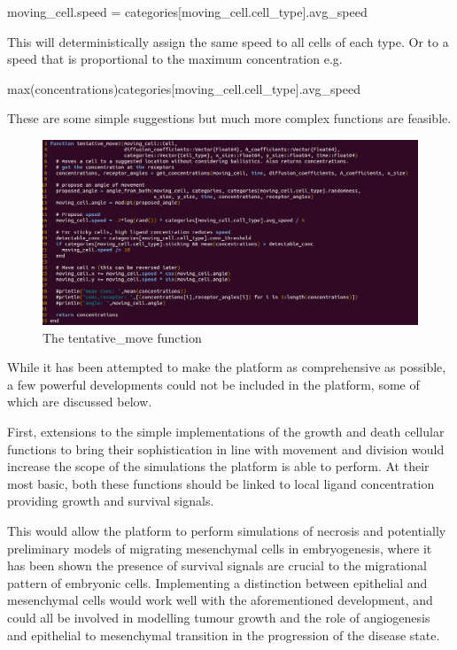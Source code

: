 \documentclass[12pt]{article}
\begin{document}
{\fontsize{10pt}{10pt} \ttfamily
moving\_cell.speed = categories{[}moving\_cell.cell\_type{]}.avg\_speed} 

This will deterministically assign the same speed to all cells of 
each type. Or to a speed that is proportional to the maximum 
concentration e.g. 

{\fontsize{10pt}{10pt}\ttfamily 
max(concentrations)categories{[}moving\_cell.cell\_type{]}.avg\_speed} 

These are some simple suggestions but much more complex functions are 
feasible.

\begin{figure}[H]
\centering
\includegraphics[width=12.23cm]{media/tentativemove.png}
\caption{The tentative\_move function}
\end{figure}

While it has been attempted to make the platform as comprehensive as 
possible, a few powerful developments could not be included in the 
platform, some of which are discussed below. 

First, extensions to the simple implementations of the growth and death 
cellular functions to bring their sophistication in line with movement 
and division would increase the scope of the simulations the platform is 
able to perform. At their most basic, both these functions should be 
linked to local ligand concentration providing growth and survival 
signals. 

This would allow the platform to perform simulations of necrosis and 
potentially preliminary models of migrating mesenchymal cells in 
embryogenesis, where it has been shown the presence of survival signals 
are crucial to the migrational pattern of embryonic cells.\cite{raz09} Implementing 
a distinction between epithelial and mesenchymal cells would work well 
with the aforementioned development, and could all be involved in 
modelling tumour growth and the role of angiogenesis and epithelial to 
mesenchymal transition in the progression of the disease state.
\end{document}

